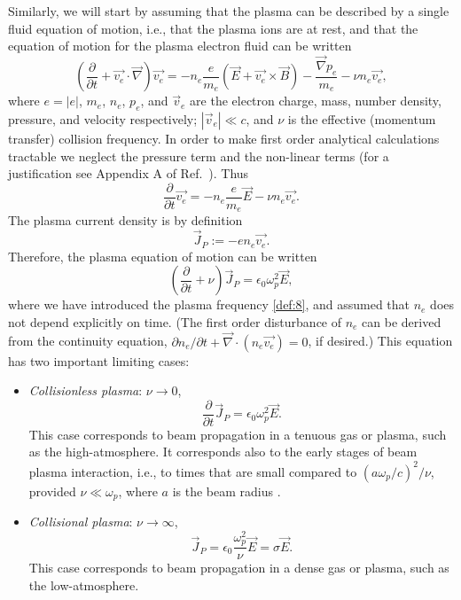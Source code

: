 \documentclass [12pt,a4paper,     ]{report} %
\newcommand{\DEF}{:=}                 %
\begin{document}
   Similarly, we will start by assuming that the plasma can be described by a single fluid equation of motion, i.e., that the plasma ions are at rest, and that the equation of motion for the plasma electron fluid can be written 
%
\begin{equation}\label{bcn:1} %
  (\frac{\partial}{\partial t} + \vec{v_e}\cdot\vec{\nabla}) \vec{v_e}
   = - n_e\frac{e}{m_e}(\vec{E}+\vec{v_e}\times\vec{B})
     - \frac{\vec{\nabla} p_e}{m_e}  - \nu n_e \vec{v_e},
\end{equation}
%
where $e=|e|$, $m_e$, $n_e$, $p_e$, and $\vec{v}_e$ are the electron charge, mass, number density, pressure, and velocity respectively; $|\vec{v}_e| \ll c$, and $\nu$ is the effective (momentum transfer) collision frequency.    In order to make first order analytical calculations tractable we neglect the pressure term and the non-linear terms (for a justification see Appendix A of Ref.~\cite{KUPPE1973A}).  Thus
%
\begin{equation}\label{bcn:2} %
  \frac{\partial}{\partial t} \vec{v_e}
   = - n_e\frac{e}{m_e} \vec{E}  - \nu n_e \vec{v_e}.
\end{equation}
%
The plasma current density is by definition
%
\begin{equation}\label{bcn:3} %
     \vec{J}_P \DEF - e n_e \vec{v_e}.
\end{equation}
%
Therefore, the plasma equation of motion can be written \cite{COX--1970-}
%
\begin{equation}\label{bcn:4} %
       (\frac{\partial}{\partial t} + \nu) \vec{J}_P
                   = \epsilon_0 \omega_p^2 \vec{E},
\end{equation}
%
where we have introduced the plasma frequency \eqref{def:8}, and assumed that $n_e$ does not depend explicitly on time. (The first order disturbance of $n_e$ can be derived from the continuity equation, $\partial n_e/\partial t + \vec{\nabla}\cdot(n_e \vec{v_e}) =0$, if desired.)  This equation has two important limiting cases:
\begin{itemize}

\item \emph{Collisionless plasma}: $\nu \rightarrow 0$,
%
\begin{equation}\label{bcn:5} %
     \frac{\partial}{\partial t} \vec{J}_P = \epsilon_0 \omega_p^2 \vec{E}.
\end{equation}
%
This case corresponds to beam propagation in a tenuous gas or plasma, such as the high-atmosphere.  It corresponds also to the early stages of beam plasma interaction, i.e., to times that are small compared to $(a\omega_p/c)^2/\nu$, provided $\nu \ll \omega_p$, where $a$ is the beam radius \cite{KUPPE1973A}.



\item \emph{Collisional plasma}: $\nu \rightarrow \infty$,
%
\begin{equation}\label{bcn:6} %
     \vec{J}_P = \epsilon_0 \frac{\omega_p^2}{\nu} \vec{E}
         = \sigma  \vec{E}.
\end{equation}
%
This case corresponds to beam propagation in a dense gas or plasma, such as the low-atmosphere.

\end{itemize}
\end{document}
